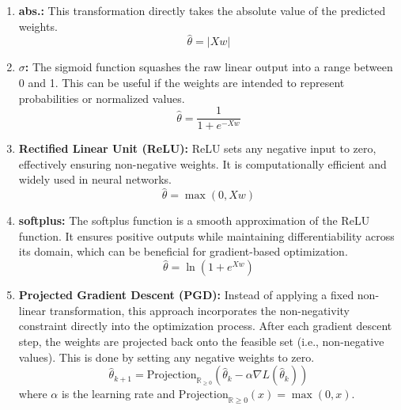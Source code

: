 \begin{enumerate}
    \item \textbf{abs.:} This transformation directly takes the absolute value of the predicted weights.
    \[\hat{\theta} = |Xw| \tag{16}\]
    \item \textbf{$\sigma$:} The sigmoid function squashes the raw linear output into a range between 0 and 1. This can be useful if the weights are intended to represent probabilities or normalized values.
    \[\hat{\theta} = \frac{1}{1+e^{-Xw}} \tag{17}\]
    \item \textbf{Rectified Linear Unit (ReLU):} ReLU sets any negative input to zero, effectively ensuring non-negative weights. It is computationally efficient and widely used in neural networks.
    \[\hat{\theta} = \max(0,Xw) \tag{18}\]
    \item \textbf{softplus:} The softplus function is a smooth approximation of the ReLU function. It ensures positive outputs while maintaining differentiability across its domain, which can be beneficial for gradient-based optimization.
    \[\hat{\theta} = \ln(1+e^{Xw}) \tag{19}\]
    \item \textbf{Projected Gradient Descent (PGD):} Instead of applying a fixed non-linear transformation, this approach incorporates the non-negativity constraint directly into the optimization process. After each gradient descent step, the weights are projected back onto the feasible set (i.e., non-negative values). This is done by setting any negative weights to zero. 
    \[ \hat{\theta}_{k+1} = \text{Projection}_{\mathbb{R}_{\ge 0}}(\hat{\theta}_k - \alpha \nabla L(\hat{\theta}_k)) \tag{20} \] 
    where $\alpha$ is the learning rate and $\text{Projection}_{\mathbb{R}{\ge 0}}(x) = \max(0, x)$. 
\end{enumerate}

